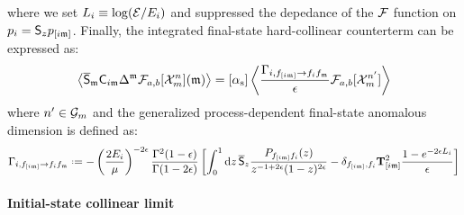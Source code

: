 where we set $ L_i \equiv \log (\mathcal{E} / E_i) $ and suppressed the depedance of the $ \mathcal{F} $ function on $ p_i = \mathsf{S}_z p_{[i\mathfrak{m}]} $. Finally, the integrated final-state hard-collinear counterterm can be expressed as:
\begin{equation}
  \left\langle \overline{\mathsf{S}}_{\mathfrak{m}} \mathsf{C}_{i\mathfrak{m}} \Delta^{\mathfrak{m}} \mathcal{F}_{a,b}[\mathcal{X}^{n}_{m}](\mathfrak{m}) \right\rangle = [\alpha_\text{s}] \left\langle \frac{\Gamma_{i,f_{[i\mathfrak{m}]} \rightarrow f_i f_{\mathfrak{m}}}}{\epsilon} \mathcal{F}_{a,b}[\mathcal{X}^{n'}_{m}] \right\rangle
  \label{eq:hc-fs}
\end{equation}
where $ n' \in \mathcal{G}_m $ and the generalized process-dependent final-state anomalous dimension is defined as:
\begin{equation}
  \Gamma_{i,f_{[i\ur]} \rightarrow f_i f_\ur} \defeq - \left( \frac{2E_i}{\mu} \right)^{-2\de} \frac{\Gamma^2(1-\de)}{\Gamma(1-2\de)} \left[ \int_0^1 \dd z\, \oso_z \frac{\spl_{f_{[i\ur]}f_i}(z)}{z^{-1+2\de} (1-z)^{2\de}} - \delta_{f_{[i\ur]},f_i} \tco^2_{[i\ur]} \frac{1 - e^{-2\de \leg_i}}{\de} \right]
  \label{eq:fin-gen-an-dim-pd}
\end{equation}

\paragraph{Initial-state collinear limit}

